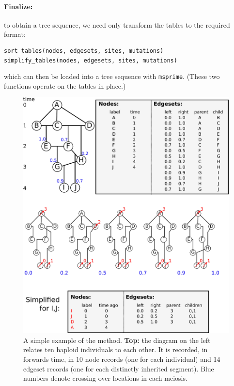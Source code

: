 \documentclass{article}
\newcommand{\msprime}{\texttt{msprime}}
\begin{document}
\paragraph{Finalize:}
to obtain a tree sequence, we need only transform the tables to the required format:
\begin{lstlisting}
sort_tables(nodes, edgesets, sites, mutations)
simplify_tables(nodes, edgesets, sites, mutations)
\end{lstlisting}
which can then be loaded into a tree sequence with \msprime.
(These two functions operate on the tables in place.)



\begin{figure}
    \begin{center}
        \includegraphics{method_diagram}
    \end{center}
    \caption{
        A simple example of the method.
        \textbf{Top:} the diagram on the left relates ten haploid individuals to each other.
        It is recorded, in forwards time,
        in 10 node records (one for each individual)
        and 14 edgeset records (one for each distinctly inherited segment).
        Blue numbers denote crossing over locations in each meiosis.
}
\end{figure}
\end{document}
